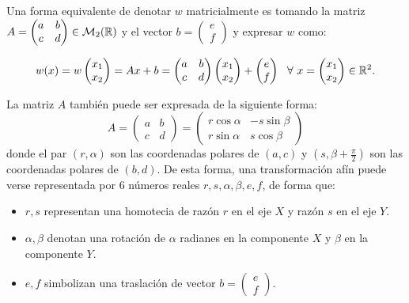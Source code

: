 Una forma equivalente de denotar $w$ matricialmente es tomando la matriz $A=\begin{pmatrix}
    a & b \\
    c & d
\end{pmatrix}\in\mathcal{M}_2(\mathbb{R})$ y el vector $b=\begin{pmatrix}
    e \\
    f
\end{pmatrix}$ y expresar $w$ como:

\begin{equation}
    w(x) =
    w\begin{pmatrix}
        x_1 \\
        x_2
    \end{pmatrix} = Ax + b = \begin{pmatrix}
        a & b \\
        c & d
    \end{pmatrix}\begin{pmatrix}
        x_1 \\
        x_2
    \end{pmatrix}+\begin{pmatrix}
        e \\
        f
    \end{pmatrix} \ \ \forall \ x = \begin{pmatrix}
        x_1 \\
        x_2
    \end{pmatrix}\in\mathbb{R}^2.
\end{equation}

La matriz $A$ también puede ser expresada de la siguiente forma:
\begin{equation}
    A = \begin{pmatrix}
        a & b \\
        c & d
    \end{pmatrix} = \begin{pmatrix}
        r\cos\alpha & -s\sin\beta \\
        r\sin\alpha & s\cos\beta
    \end{pmatrix}
\end{equation}
donde el par $(r,\alpha)$ son las coordenadas polares de $(a,c)$ y $(s,\beta+\frac \pi 2)$ son las coordenadas polares de $(b,d)$. De esta forma, una transformación afín puede verse representada por 6 números reales $r,s,\alpha,\beta,e,f$, de forma que:
\begin{itemize}
    \item $r,s$ representan una homotecia de razón $r$ en el eje $X$ y razón $s$ en el eje $Y$.
    \item $\alpha,\beta$ denotan una rotación de $\alpha$ radianes en la componente $X$ y $\beta$ en la componente $Y$.
    \item $e,f$ simbolizan una traslación de vector $b=\begin{pmatrix} e \\ f\end{pmatrix}$.
\end{itemize}

